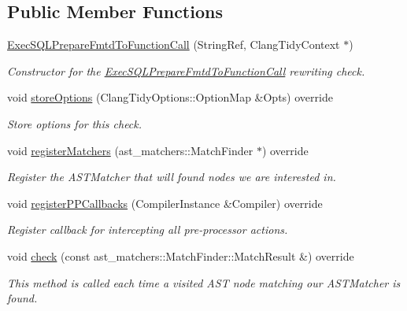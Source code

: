 \subsection*{Public Member Functions}
\begin{DoxyCompactItemize}
\item 
\hyperlink{classclang_1_1tidy_1_1pagesjaunes_1_1_exec_s_q_l_prepare_fmtd_to_function_call_ab8711ab57fe8dab91a56a31d01da3631}{Exec\+S\+Q\+L\+Prepare\+Fmtd\+To\+Function\+Call} (String\+Ref, Clang\+Tidy\+Context $\ast$)
\begin{DoxyCompactList}\small\item\em Constructor for the \hyperlink{classclang_1_1tidy_1_1pagesjaunes_1_1_exec_s_q_l_prepare_fmtd_to_function_call}{Exec\+S\+Q\+L\+Prepare\+Fmtd\+To\+Function\+Call} rewriting check. \end{DoxyCompactList}\item 
void \hyperlink{classclang_1_1tidy_1_1pagesjaunes_1_1_exec_s_q_l_prepare_fmtd_to_function_call_a34e993981fdc85049c3fa7164f485b4d}{store\+Options} (Clang\+Tidy\+Options\+::\+Option\+Map \&Opts) override
\begin{DoxyCompactList}\small\item\em Store options for this check. \end{DoxyCompactList}\item 
void \hyperlink{classclang_1_1tidy_1_1pagesjaunes_1_1_exec_s_q_l_prepare_fmtd_to_function_call_a4885eaffc6d1cfe1a256487ad4530c95}{register\+Matchers} (ast\+\_\+matchers\+::\+Match\+Finder $\ast$) override
\begin{DoxyCompactList}\small\item\em Register the A\+S\+T\+Matcher that will found nodes we are interested in. \end{DoxyCompactList}\item 
void \hyperlink{classclang_1_1tidy_1_1pagesjaunes_1_1_exec_s_q_l_prepare_fmtd_to_function_call_aa5ea8fe66191404087449262858f2555}{register\+P\+P\+Callbacks} (Compiler\+Instance \&Compiler) override
\begin{DoxyCompactList}\small\item\em Register callback for intercepting all pre-\/processor actions. \end{DoxyCompactList}\item 
void \hyperlink{classclang_1_1tidy_1_1pagesjaunes_1_1_exec_s_q_l_prepare_fmtd_to_function_call_a2110f550c514850972d8fe7a57c9d754}{check} (const ast\+\_\+matchers\+::\+Match\+Finder\+::\+Match\+Result \&) override
\begin{DoxyCompactList}\small\item\em This method is called each time a visited A\+ST node matching our A\+S\+T\+Matcher is found. \end{DoxyCompactList}\item 

\end{DoxyCompactItemize}
